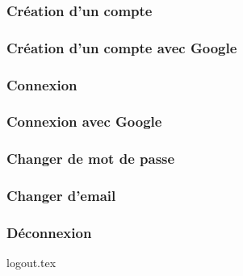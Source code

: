 \subsubsection{Création d'un compte}
\subsubsection{Création d'un compte avec Google}
\subsubsection{Connexion}
\subsubsection{Connexion avec Google}
\subsubsection{Changer de mot de passe}
\subsubsection{Changer d'email}

\subsubsection{Déconnexion}
{logout.tex}